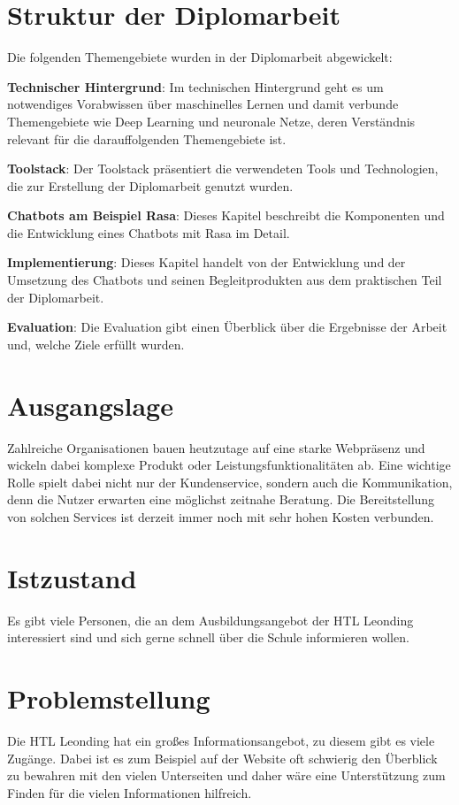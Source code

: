 \section{Struktur der Diplomarbeit}

Die folgenden Themengebiete wurden in der Diplomarbeit abgewickelt:

\textbf{Technischer Hintergrund}: Im technischen Hintergrund geht es um notwendiges Vorabwissen über maschinelles Lernen und damit verbunde Themengebiete wie Deep Learning und neuronale Netze, deren Verständnis relevant für die darauffolgenden Themengebiete ist.

\textbf{Toolstack}: Der Toolstack präsentiert die verwendeten Tools und Technologien, die zur Erstellung der Diplomarbeit genutzt wurden.

\textbf{Chatbots am Beispiel Rasa}: Dieses Kapitel beschreibt die Komponenten und die Entwicklung eines Chatbots mit Rasa im Detail.

\textbf{Implementierung}: Dieses Kapitel handelt von der Entwicklung und der Umsetzung des Chatbots und seinen Begleitprodukten aus dem praktischen Teil der Diplomarbeit.

\textbf{Evaluation}: Die Evaluation gibt einen Überblick über die Ergebnisse der Arbeit und, welche Ziele erfüllt wurden.



\section{Ausgangslage}

Zahlreiche Organisationen bauen heutzutage auf eine starke Webpräsenz und wickeln dabei komplexe Produkt\- oder Leistungsfunktionalitäten ab.
Eine wichtige Rolle spielt dabei nicht nur der Kundenservice, sondern auch die Kommunikation, denn die Nutzer erwarten eine möglichst zeitnahe Beratung.
Die Bereitstellung von solchen Services ist derzeit immer noch mit sehr hohen Kosten verbunden.

\section{Istzustand}
Es gibt viele Personen, die an dem Ausbildungsangebot der HTL Leonding interessiert sind und sich gerne schnell über die Schule informieren wollen.


\section{Problemstellung}
Die HTL Leonding hat ein großes Informationsangebot, zu diesem gibt es viele Zugänge.
Dabei ist es zum Beispiel auf der Website oft schwierig den Überblick zu bewahren mit den vielen Unterseiten und daher wäre eine Unterstützung zum Finden für die vielen Informationen hilfreich.

